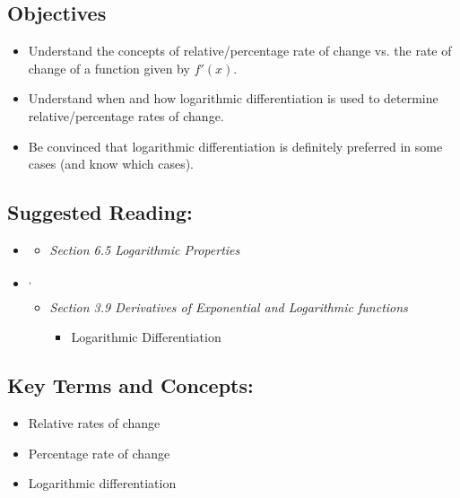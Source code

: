 
\vspace{-0.25 in}
\begin{framed}
\subsection*{Objectives}
\begin{itemize}
    \item Understand the concepts of relative/percentage rate of change vs. the rate of change of a function given by $f'(x)$.
    \item Understand when and how logarithmic differentiation is used to determine relative/percentage rates of change.
    \item Be convinced that logarithmic differentiation is definitely preferred in some cases (and know which cases).
\end{itemize}

\subsection*{Suggested Reading:}
\begin{itemize}
\item \cite{openstaxColAlgebra}\footnotemark[1]
    \begin{itemize}
        \item \emph{Section 6.5 Logarithmic Properties}
    \end{itemize}

\item \cite{openstax}\footnotemark[2]\textsuperscript{,}\footnotemark[3]
    \begin{itemize}
        \item \emph{Section 3.9 Derivatives of Exponential and Logarithmic functions}
        \begin{itemize}
            \item Logarithmic Differentiation
        \end{itemize}
    \end{itemize}
        
  
\end{itemize}
\subsection*{Key Terms and Concepts:} 

\begin{multicols}{2}
\begin{itemize}
    \item Relative rates of change
    \item Percentage rate of change
    \item Logarithmic differentiation
\end{itemize}
\end{multicols}
\end{framed}
